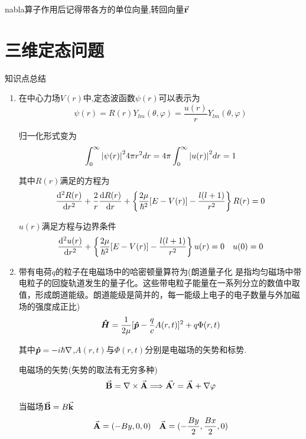 \documentclass{article}
\begin{document}
            nabla算子作用后记得带各方的单位向量,转回向量$\va{r}$









    \section{三维定态问题}
            \begin{formal}
                知识点总结
                
                \begin{enumerate}
                    \item 在中心力场$V(r)$中,定态波函数$\psi(r)$可以表示为
                    $$ \psi(r) = R(r) Y_{lm}(\theta,\varphi) = \frac{u(r)}{r}Y_{lm}(\theta,\varphi) $$

                    归一化形式变为
                    $$ \int_{0}^{\infty} \abs{\psi(r)}^{2} 4\pi r^{2} dr = 4 \pi \int_{0}^{\infty}\abs{u(r)}^{2} dr = 1 $$
                    
                    其中$R(r)$满足的方程为
                    $$ \dv[2]{R(r)}{r} + \frac{2}{r} \dv{R(r)}{r} + \left\{ \frac{2\mu}{\hbar^{2}}[E-V(r)] - \frac{l(l+1)}{r^{2}} \right\}   R(r)  = 0 $$

                    $u(r)$满足方程与边界条件
                    $$ \dv[2]{u(r)}{r} + \left\{   \frac{2\mu}{\hbar^{2}}[E-V(r)] - \frac{l(l+1)}{r^{2}} \right\} u(r) = 0 \quad u(0) = 0 $$

                    \item 带有电荷$q$的粒子在电磁场中的哈密顿量算符为(朗道量子化
                    是指均匀磁场中带电粒子的回旋轨道发生的量子化。这些带电粒子能量在一系列分立的数值中取值，形成朗道能级。朗道能级是简并的，每一能级上电子的电子数量与外加磁场的强度成正比)
                    $$ \vu*{H} = \frac{1}{2\mu} [\vu*{p} - \frac{q}{c} A(r,t) ]^{2} + q \Phi(r,t) $$

                    其中$\vu*{p} = -i\hbar \nabla$,$A(r,t)$与$\Phi(r,t)$分别是电磁场的矢势和标势.

                    电磁场的矢势(矢势的取法有无穷多种)
                    $$ \va{B} = \nabla \times \va{A}  \Longrightarrow  \va{A'} = \va{A} + \nabla \varphi $$

                    当磁场$ \va{B} = B \va{k} $
                    $$ \va{A} = (-By,0,0) \quad \va{A} = (-\frac{By}{2},\frac{Bx}{2},0) $$
                    

\end{enumerate}
\end{formal}
\end{document}
